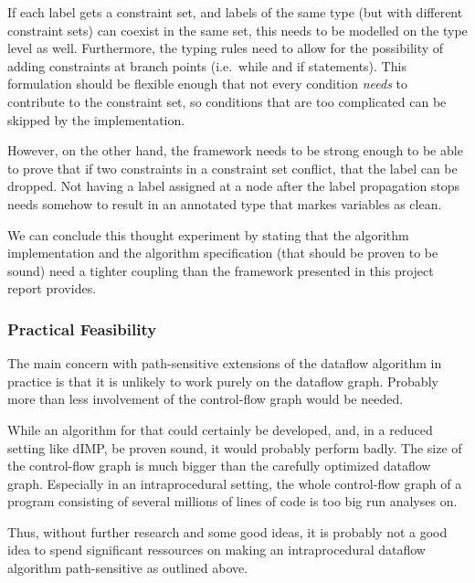 If each label gets a constraint set, and labels of the same type (but with different constraint sets)
can coexist in the same set, this needs to be modelled on the type level as well.
Furthermore, the typing rules need to allow for the possibility of adding constraints at
branch points (i.e.\ while and if statements).
This formulation should be flexible enough that not every condition \emph{needs}
to contribute to the constraint set, so conditions that are too complicated can be skipped
by the implementation.

However, on the other hand, the framework needs to be strong enough to be able to prove that if
two constraints in a constraint set conflict, that the label can be dropped.
Not having a label assigned at a node after the label propagation stops needs somehow to 
result in an annotated type that markes variables as clean.

We can conclude this thought experiment by stating that the algorithm implementation and
the algorithm specification (that should be proven to be sound) need a tighter coupling
than the framework presented in this project report provides.

\subsubsection*{Practical Feasibility}
The main concern with path-sensitive extensions of the dataflow algorithm in practice is
that it is unlikely to work purely on the dataflow graph.
Probably more than less involvement of the control-flow graph would be needed.

While an algorithm for that could certainly be developed, and, in a reduced setting like
dIMP, be proven sound, it would probably perform badly.
The size of the control-flow graph is much bigger than the carefully optimized dataflow graph.
Especially in an intraprocedural setting, the whole control-flow graph of a program
consisting of several millions of lines of code is too big run analyses on.

Thus, without further research and some good ideas, it is probably not a good idea
to spend significant ressources on making an intraprocedural dataflow algorithm path-sensitive
as outlined above.
